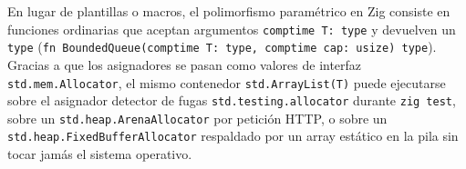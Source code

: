 \documentclass{book}
\begin{document}
En lugar de plantillas o macros, el polimorfismo paramétrico en Zig consiste en funciones ordinarias que aceptan argumentos \texttt{comptime T: type} y devuelven un \texttt{type} (\texttt{fn BoundedQueue(comptime T: type, comptime cap: usize) type}). Gracias a que los asignadores se pasan como valores de interfaz \texttt{std.mem.Allocator}, el mismo contenedor \texttt{std.ArrayList(T)} puede ejecutarse sobre el asignador detector de fugas \texttt{std.testing.allocator} durante \texttt{zig test}, sobre un \texttt{std.heap.ArenaAllocator} por petición HTTP, o sobre un \texttt{std.heap.FixedBufferAllocator} respaldado por un array estático en la pila sin tocar jamás el sistema operativo.
\end{document}
